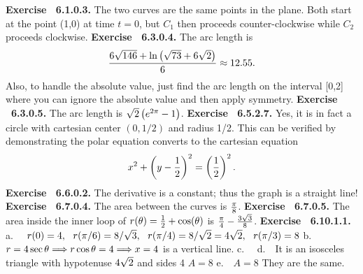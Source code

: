  {\noindent \protect \bf  Exercise ~6.1.0.3.} The two curves are the same points in the plane. Both start at the point (1,0) at time $t=0$, but $C_1$ then proceeds counter-clockwise while $C_2$ proceeds clockwise. \protect \newline  \protect \newline  
 {\noindent \protect \bf  Exercise ~6.3.0.4.} The arc length is $$\protect \frac  {6\protect \sqrt  {146}+\protect \qopname  \relax o{ln}\left (\protect \sqrt  {73}+6\protect \sqrt  {2}\right )}{6}\approx 12.55.$$ Also, to handle the absolute value, just find the arc length on the interval [0,2] where you can ignore the absolute value and then apply symmetry. \protect \newline  \protect \newline  
 {\noindent \protect \bf  Exercise ~6.3.0.5.} The arc length is $\protect \sqrt  {2}\left (e^{2\pi }-1\right )$. \protect \newline  \protect \newline  
 {\noindent \protect \bf  Exercise ~6.5.2.7.} Yes, it is in fact a circle with cartesian center $\left (0,1/2\right )$ and radius 1/2. This can be verified by demonstrating the polar equation converts to the cartesian equation $$x^2+\left (y-\protect \frac  {1}{2}\right )^2=\left (\protect \frac  {1}{2}\right )^2. $$ \protect \newline  \protect \newline  
 {\noindent \protect \bf  Exercise ~6.6.0.2.} The derivative is a constant; thus the graph is a straight line! \protect \newline  \protect \newline  
 {\noindent \protect \bf  Exercise ~6.7.0.4.} The area between the curves is $\protect \frac  {\pi }{8}$. \protect \newline  \protect \newline  
 {\noindent \protect \bf  Exercise ~6.7.0.5.} The area inside the inner loop of $r(\theta )=\protect \frac  {1}{2}+\protect \qopname  \relax o{cos}(\theta )$ is $\protect \frac  {\pi }{4}-\protect \frac  {3\protect \sqrt  {3}}{8}$. \protect \newline  \protect \newline  
 {\noindent \protect \bf  Exercise ~6.10.1.1.} a.~~ $r(0) = 4,~~r(\pi /6) = 8/\protect \sqrt  {3},~~r(\pi /4) =8/\protect \sqrt  {2}=4\protect \sqrt  {2},~~r(\pi /3)= 8 $ b.~~ $r=4\protect \qopname  \relax o{sec}{\theta } \DOTSB \protect \Relbar \protect \joinrel \Rightarrow r \protect \qopname  \relax o{cos}{\theta } = 4 \DOTSB \protect \Relbar \protect \joinrel \Rightarrow x=4$ is a vertical line. c.~~ d.~~It is an isosceles triangle with hypotenuse $4\protect \sqrt  {2}$ and sides 4 $A=8$ e.~~$A=8$ They are the same.  \protect \newline  \protect \newline  
